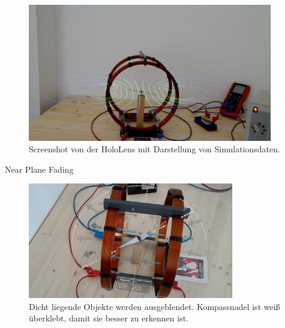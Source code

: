 \begin{frame}[fragile]{}
\begin{figure}
	\vspace{-10px}
	\centering
	\includegraphics[width=0.95\textwidth]{images/HL/simulation.jpg}\\
	\vspace{0.3cm}
	\scriptsize Screenshot von der HoloLens mit Darstellung von Simulationsdaten.
\end{figure}
\end{frame}

\begin{frame}[fragile]{Near Plane Fading}
\begin{figure}
	\includegraphics[width=0.8\textwidth]{images/HL/compass.jpg}\\
	\vspace{0.3cm}
	\scriptsize Dicht liegende Objekte werden ausgeblendet. Kompassnadel ist weiß überklebt, damit sie besser zu erkennen ist.
\end{figure}
\end{frame}

